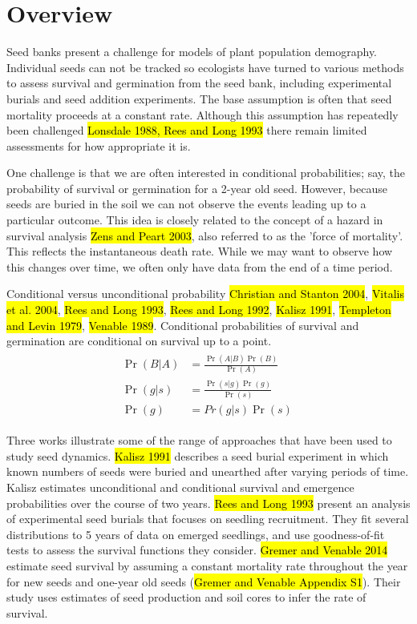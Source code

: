 \documentclass[12pt, oneside, titlepage]{article}   	%
\begin{document}
\section{Overview}

Seed banks present a challenge for models of plant population demography. Individual seeds can not be tracked so ecologists have turned to various methods to assess survival and germination from the seed bank, including experimental burials and seed addition experiments. The base assumption is often that seed mortality proceeds at a constant rate. Although this assumption has repeatedly been challenged \hl{Lonsdale 1988, Rees and Long 1993} there remain limited assessments for how appropriate it is. 

One challenge is that we are often interested in conditional probabilities; say, the probability of survival or germination for a 2-year old seed. However, because seeds are buried in the soil we can not observe the events leading up to a particular outcome. This idea is closely related to the concept of a hazard in survival analysis \hl{Zens and Peart 2003}, also referred to as the 'force of mortality'. This reflects the instantaneous death rate. While we may want to observe how this changes over time, we often only have data from the end of a time period. 

Conditional versus unconditional probability \hl{Christian and Stanton 2004}, \hl{Vitalis et al. 2004}, \hl{Rees and Long 1993}, \hl{Rees and Long 1992}, \hl{Kalisz 1991}, \hl{Templeton and Levin 1979}, \hl{Venable 1989}. Conditional probabilities of survival and germination are conditional on survival up to a point. 
%
\begin{align}
  \begin{split}
\Pr( B|A )  & = \frac{\Pr( A|B ) \Pr( B )}{ \Pr ( A )} \\
\Pr( g | s )  & = \frac{\Pr( s | g ) \Pr( g )}{ \Pr ( s )} \\ 
 \Pr( g ) & = Pr( g | s ) \Pr( s ) \
  \end{split}
\end{align}
%

Three works illustrate some of the range of approaches that have been used to study seed dynamics. \hl{Kalisz 1991} describes a seed burial experiment in which known numbers of seeds were buried and unearthed after varying periods of time. Kalisz estimates unconditional and conditional survival and emergence probabilities over the course of two years. \hl{Rees and Long 1993} present an analysis of experimental seed burials that focuses on seedling recruitment. They fit several distributions to 5 years of data on emerged seedlings, and use goodness-of-fit tests to assess the survival functions they consider. \hl{Gremer and Venable 2014} estimate seed survival by assuming a constant mortality rate throughout the year for new seeds and one-year old seeds (\hl{Gremer and Venable Appendix S1}). Their study uses estimates of seed production and soil cores to infer the rate of survival.
\end{document}
